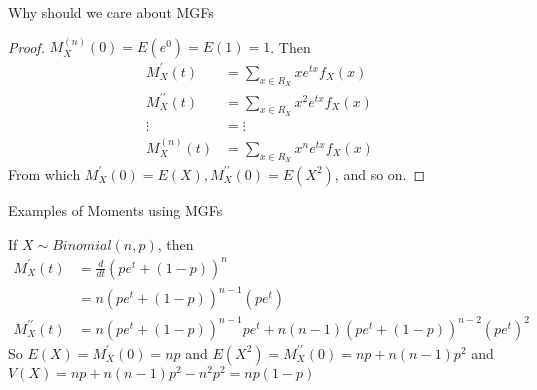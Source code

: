 \documentclass[12pt,ignorenonframetext,compress]{beamer}
\begin{document}
\begin{frame}{Why should we care about MGFs}

\begin{proof}
$M_X^{(n)}(0) = E(e^0) = E(1) =1$. Then
\begin{align*}
M_X^\prime (t) &= \sum_{x \in R_X} x e^{tx} f_X(x) \\
M_X^{\prime\prime} (t) &= \sum_{x \in R_X} x^2 e^{tx} f_X(x) \\
\vdots & = \vdots \\
M_X^{(n)} (t) &= \sum_{x \in R_X} x^n e^{tx} f_X(x) 
\end{align*}
From which $M_X^\prime (0) = E(X), M_X^{\prime\prime}(0) = E(X^2)$, and so on.
\end{proof}

\end{frame}

\begin{frame}{Examples of Moments using MGFs}

\begin{example}[Binomial]
If $X\sim Binomial(n,p)$, then 
\begin{align*}
M_X^{\prime}(t) &= \frac{d}{dt} (pe^t + (1-p))^n \\
& = n(pe^t + (1-p))^{n-1} (pe^t)\\
M_X^{\prime\prime}(t) &= n(pe^t + (1-p))^{n-1}pe^t + n(n-1)(pe^t + (1-p))^{n-2}(pe^t)^2
\end{align*}
So $E(X) = M_X^\prime(0) = np$ and $E(X^2) = M_X^{\prime\prime}(0) = np + n(n-1)p^2$ and $V(X) = np + n(n-1)p^2 - n^2p^2 = np(1-p)$
\end{example}

\end{frame}
\end{document}
